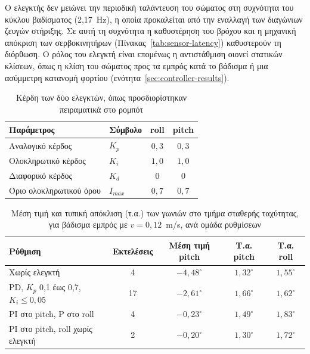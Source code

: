 \documentclass[11pt]{report}
\begin{document}
Ο ελεγκτής δεν μειώνει την περιοδική ταλάντευση του σώματος στη συχνότητα του
κύκλου βαδίσματος (2,17~Hz), η οποία προκαλείται από την εναλλαγή των διαγώνιων
ζευγών στήριξης. Σε αυτή τη συχνότητα η καθυστέρηση του βρόχου και η μηχανική
απόκριση των σερβοκινητήρων (Πίνακας~\ref{tab:sensor-latency}) καθυστερούν τη
διόρθωση. Ο ρόλος του ελεγκτή είναι επομένως η αντιστάθμιση οιονεί στατικών
κλίσεων, όπως η κλίση του σώματος προς τα εμπρός κατά το βάδισμα ή μια
ασύμμετρη κατανομή φορτίου (ενότητα~\ref{sec:controller-results}).

\begin{table}[htbp]
    \centering
    \small
    \begin{tabular}{@{}l l c c@{}}
        \toprule
        Παράμετρος & Σύμβολο & roll & pitch \\
        \midrule
        Αναλογικό κέρδος & $K_p$ & $0{,}3$ & $0{,}3$ \\
        Ολοκληρωτικό κέρδος & $K_i$ & $1{,}0$ & $1{,}0$ \\
        Διαφορικό κέρδος & $K_d$ & $0$ & $0$ \\
        Όριο ολοκληρωτικού όρου & $I_{max}$ & $0{,}7$ & $0{,}7$ \\
        \bottomrule
    \end{tabular}
    \caption[Κέρδη των ελεγκτών PID]{Κέρδη των δύο ελεγκτών, όπως
    προσδιορίστηκαν πειραματικά στο ρομπότ}
    \label{tab:pid-gains}
\end{table}

\begin{table}[htbp]
    \centering
    \small
    \begin{tabular}{@{}p{5.2cm} c c c c@{}}
        \toprule
        Ρύθμιση & Εκτελέσεις & Μέση τιμή pitch & Τ.α. pitch & Τ.α. roll \\
        \midrule
        Χωρίς ελεγκτή & 4 & $-4{,}48^\circ$ & $1{,}32^\circ$ & $1{,}55^\circ$ \\
        PD, $K_p$ 0,1 έως 0,7, $K_i \le 0{,}05$ & 17 & $-2{,}61^\circ$ & $1{,}66^\circ$ & $1{,}62^\circ$ \\
        PI στο pitch, P στο roll & 4 & $-0{,}23^\circ$ & $1{,}49^\circ$ & $1{,}83^\circ$ \\
        PI στο pitch, roll χωρίς ελεγκτή & 2 & $-0{,}20^\circ$ & $1{,}30^\circ$ & $1{,}72^\circ$ \\
        \bottomrule
    \end{tabular}
    \caption[Ρυθμίσεις του ελεγκτή κατά τη ρύθμιση]{Μέση τιμή και τυπική
    απόκλιση (τ.α.) των γωνιών στο τμήμα σταθερής ταχύτητας, για βάδισμα εμπρός
    με $v = 0{,}12$~m/s, ανά ομάδα ρυθμίσεων}
    \label{tab:pid-tuning}
\end{table}
\end{document}
